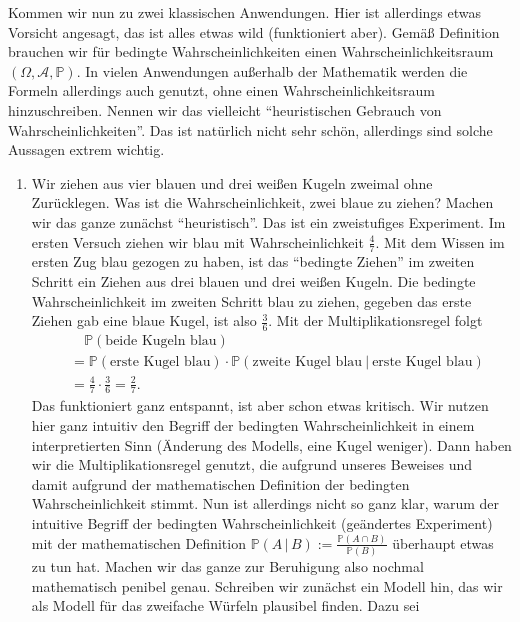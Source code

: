 Kommen wir nun zu zwei klassischen Anwendungen. Hier ist allerdings etwas Vorsicht angesagt, das ist alles etwas wild (funktioniert aber). Gem\"a\ss{} Definition brauchen wir f\"ur bedingte Wahrscheinlichkeiten einen Wahrscheinlichkeitsraum $(\Omega, \mathcal A, \mathbb P)$. In vielen Anwendungen au\ss erhalb der Mathematik werden die Formeln allerdings auch genutzt, ohne einen Wahrscheinlichkeitsraum hinzuschreiben. Nennen wir das vielleicht \enquote{heuristischen Gebrauch von Wahrscheinlichkeiten}. Das ist nat\"urlich nicht sehr sch\"on, allerdings sind solche Aussagen extrem wichtig. 

\begin{beispiel} \abs

	\begin{enumerate}[label=(\roman*)]
		\item Wir ziehen aus vier blauen und drei weißen Kugeln zweimal ohne Zurücklegen. Was ist die Wahrscheinlichkeit, zwei blaue zu ziehen? Machen wir das ganze zun\"achst \enquote{heuristisch}. Das ist ein zweistufiges Experiment. Im ersten Versuch ziehen wir blau mit Wahrscheinlichkeit $\frac{4}{7}$. Mit dem Wissen im ersten Zug blau gezogen zu haben, ist das \enquote{bedingte Ziehen} im zweiten Schritt ein Ziehen aus drei blauen und drei wei\ss en Kugeln. Die bedingte Wahrscheinlichkeit im zweiten Schritt blau zu ziehen, gegeben das erste Ziehen gab eine blaue Kugel, ist also $\frac{3}{6}$. Mit der Multiplikationsregel folgt
		\begin{align*} 
		&\quad \mathbb{P}(\text{beide Kugeln blau}) \\
		&= \mathbb{P}(\text{erste Kugel blau}) \cdot \mathbb{P}(\text{zweite Kugel blau} \: | \: \text{erste Kugel blau})\\
		& = \frac{4}{7}\cdot \frac{3}{6} = \frac{2}{7}.
		\end{align*}
		Das funktioniert ganz entspannt, ist aber schon etwas kritisch. Wir nutzen hier ganz intuitiv den Begriff der bedingten Wahrscheinlichkeit in einem interpretierten Sinn (\"Anderung des Modells, eine Kugel weniger). Dann haben wir die Multiplikationsregel genutzt, die aufgrund unseres Beweises und damit aufgrund der mathematischen Definition der bedingten Wahrscheinlichkeit stimmt. Nun ist allerdings nicht so ganz klar, warum der intuitive Begriff der bedingten Wahrscheinlichkeit (ge\"andertes Experiment) mit der mathematischen Definition $\mathbb P(A\,|\,B):=\frac{\mathbb P(A\cap B)}{\mathbb P(B)}$ \"uberhaupt etwas zu tun hat. Machen wir das ganze zur Beruhigung also nochmal mathematisch penibel genau. Schreiben wir zun\"achst ein Modell hin, das wir als Modell f\"ur das zweifache W\"urfeln plausibel finden. Dazu sei

\end{enumerate}
\end{beispiel}
